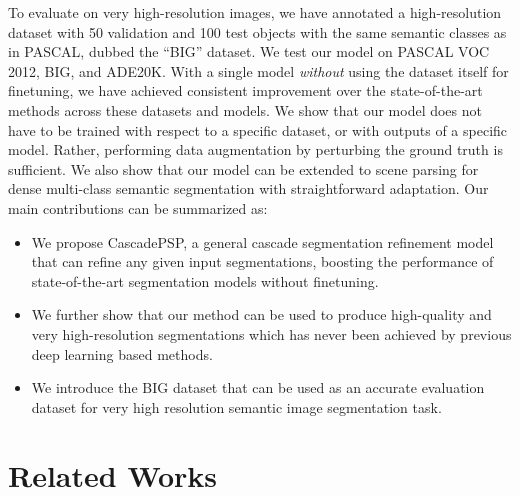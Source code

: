\documentclass[10pt,twocolumn,letterpaper]{article}
\begin{document}
To evaluate on very high-resolution images, we have annotated a high-resolution dataset with 50 validation and 100 test objects with the same semantic classes as in PASCAL, dubbed the “BIG” dataset. 
We test our model on PASCAL VOC 2012, BIG, and ADE20K. With a single model {\em without} using the dataset itself for finetuning, we have achieved consistent improvement over the state-of-the-art methods across these datasets and models. 
We show that our model does not have to be trained with respect to a specific dataset, or with outputs of a specific model. Rather, performing data augmentation by perturbing the ground truth is sufficient. 
We also show that our model can be extended to scene parsing for dense multi-class semantic segmentation with straightforward adaptation.
Our main contributions can be summarized as:

\vspace{-5pt}
\begin{itemize}
    \item We propose CascadePSP, a general cascade segmentation refinement model that can refine any given input segmentations, boosting the performance of state-of-the-art segmentation models without finetuning.
    \vspace{-5pt}
    \item We further show that our method can be used to produce high-quality and very high-resolution segmentations which has never been achieved by previous deep learning based methods.
    \vspace{-5pt}
    \item We introduce the BIG dataset that can be used as an accurate evaluation dataset for very high resolution semantic image segmentation task. 
\end{itemize}

\vspace{-0.10in}
\section{Related Works}
\vspace{-0.05in}
\end{document}
